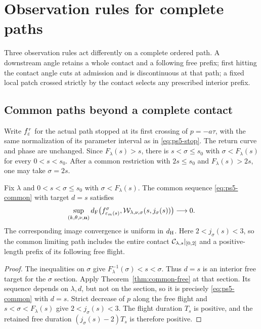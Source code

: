 \section{Observation rules for complete paths}
\label{sec:observations}

Three observation rules act differently on a complete ordered path.
A downstream angle retains a whole contact and a following free prefix;
first hitting the contact angle cuts at admission and is discontinuous
at that path; a fixed local patch crossed strictly by the contact selects
any prescribed interior prefix.



\subsection{Common paths beyond a complete contact}

Write $f_\varepsilon^\tau$ for the actual path stopped at its first crossing
of $p=-a\tau$, with the same normalization of its parameter interval
as in \eqref{eq:ps5-stop}. The return curve and phase are unchanged. Since $F_\lambda(s)>s$,
there is $s<\sigma\le s_0$ with $\sigma<F_\lambda(s)$ for every
$0<s<s_0$. After a common restriction with $2s\le s_0$ and
$F_\lambda(s)>2s$, one may take $\sigma=2s$.

\begin{corollary}
\label{cor:common-downstream-contact}
Fix $\lambda$ and $0<s<\sigma\le s_0$ with
$\sigma<F_\lambda(s)$. The common sequence \eqref{eq:ps5-common}
with target $d=s$ satisfies
\[
 \sup_{(k,\theta,\nu,\mathbf n)}
 d_{\mathrm F}\bigl(f_{\varepsilon_m(s)}^\sigma,
  \mathcal W_{\lambda,\nu,\sigma}(s,j_\sigma(s))\bigr)\longrightarrow0.
\]
The corresponding image convergence is uniform in $d_{\mathrm H}$.
Here $2<j_\sigma(s)<3$, so the common limiting path includes
the entire contact $\mathcal C_{\lambda,s}|_{[0,2]}$ and a positive-length
prefix of its following free flight.
\end{corollary}

\begin{proof}
The inequalities on $\sigma$ give
$F_\lambda^{-1}(\sigma)<s<\sigma$. Thus $d=s$ is an interior
free target for the $\sigma$ section. Apply
Theorem~\ref{thm:common-free} at that section. Its sequence depends
on $\lambda,d$, but not on the section, so it is precisely
\eqref{eq:ps5-common} with $d=s$. Strict decrease of $p$ along
the free flight and $s<\sigma<F_\lambda(s)$ give
$2<j_\sigma(s)<3$. The flight duration $T_s$ is positive, and
the retained free duration $(j_\sigma(s)-2)T_s$ is therefore positive.
\end{proof}

